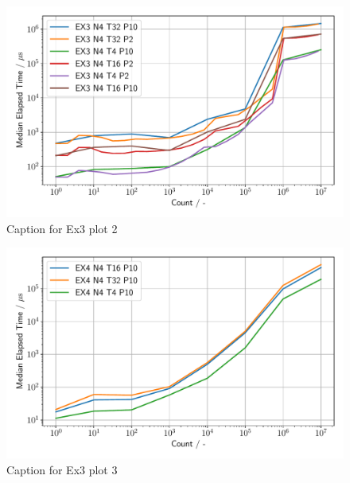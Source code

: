 \begin{figure}[h]
    \begin{center}
        \includegraphics[width=1.0\linewidth]{figures/Ex3_2.pdf}
        \caption{Caption for Ex3 plot 2}
        \label{Ex3_2_p}
    \end{center}
\end{figure}

\begin{figure}[h]
    \begin{center}
        \includegraphics[width=1.0\linewidth]{figures/Ex3_3.pdf}
        \caption{Caption for Ex3 plot 3}
        \label{Ex3_3_p}
    \end{center}
\end{figure}